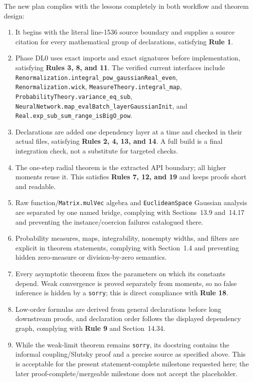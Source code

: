 The new plan complies with the lessons completely in both workflow and theorem design:
\begin{enumerate}
  \item It begins with the literal line-1536 source boundary and supplies a source citation for
    every mathematical group of declarations, satisfying \textbf{Rule 1}.
  \item Phase DL0 uses exact imports and exact signatures before implementation, satisfying
    \textbf{Rules 3, 8, and 11}.  The verified current interfaces include
    \texttt{Renormalization.integral\_pow\_gaussianReal\_even},
    \texttt{Renormalization.wick}, \texttt{MeasureTheory.integral\_map},
    \texttt{ProbabilityTheory.variance\_eq\_sub},
    \texttt{NeuralNetwork.map\_evalBatch\_layerGaussianInit}, and
    \texttt{Real.exp\_sub\_sum\_range\_isBigO\_pow}.
  \item Declarations are added one dependency layer at a time and checked in their actual files,
    satisfying \textbf{Rules 2, 4, 13, and 14}.  A full build is a final integration check, not a
    substitute for targeted checks.
  \item The one-step radial theorem is the extracted API boundary; all higher moments reuse it.
    This satisfies \textbf{Rules 7, 12, and 19} and keeps proofs short and readable.
  \item Raw function/\texttt{Matrix.mulVec} algebra and \texttt{EuclideanSpace} Gaussian analysis
    are separated by one named bridge, complying with Sections~13.9 and~14.17 and preventing the
    instance/coercion failures catalogued there.
  \item Probability measures, maps, integrability, nonempty widths, and filters are explicit in
    theorem statements, complying with Section~1.4 and preventing hidden zero-measure or
    division-by-zero semantics.
  \item Every asymptotic theorem fixes the parameters on which its constants depend.  Weak
    convergence is proved separately from moments, so no false inference is hidden by a
    \texttt{sorry}; this is direct compliance with \textbf{Rule 18}.
  \item Low-order formulas are derived from general declarations before long downstream proofs,
    and declaration order follows the displayed dependency graph, complying with
    \textbf{Rule 9} and Section~14.34.
  \item While the weak-limit theorem remains \texttt{sorry}, its docstring contains the informal
    coupling/Slutsky proof and a precise source as specified above.  This is acceptable for the
    present statement-complete milestone requested here; the later proof-complete/mergeable
    milestone does not accept the placeholder.
\end{enumerate}

